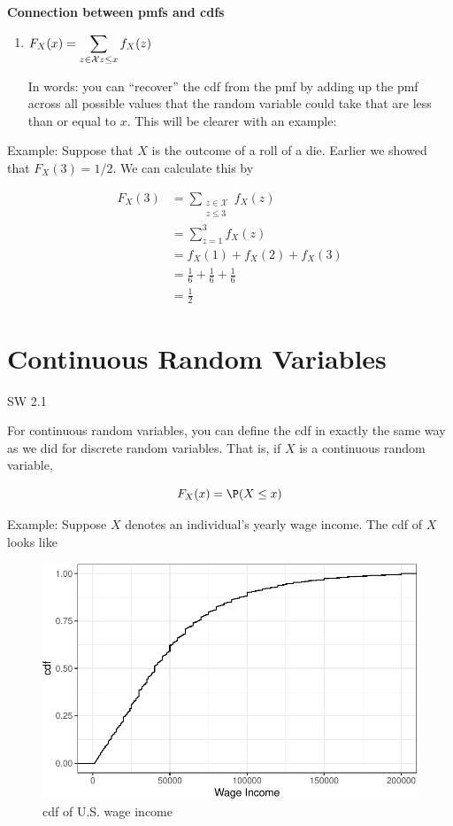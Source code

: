 \documentclass[
  letterpaper,
  DIV=11,
  numbers=noendperiod]{scrreprt}
\begin{document}
\textbf{Connection between pmfs and cdfs}

\begin{enumerate}
\def\labelenumi{\arabic{enumi}.}
\item
  \(F_X(x) = \displaystyle \sum_{z \in \mathcal{X} \\ z \leq x} f_X(z)\)

  In words: you can ``recover'' the cdf from the pmf by adding up the
  pmf across all possible values that the random variable could take
  that are less than or equal to \(x\). This will be clearer with an
  example:
\end{enumerate}

{Example: }Suppose that \(X\) is the outcome of a roll of a die. Earlier
we showed that \(F_X(3) = 1/2\). We can calculate this by

\[
  \begin{aligned}
  F_X(3) &= \sum_{\substack{z \in \mathcal{X} \\ z \leq 3}} f_X(z) \\
  &= \sum_{z=1}^3 f_X(z) \\
  &= f_X(1) + f_X(2) + f_X(3) \\
  &= \frac{1}{6} + \frac{1}{6} + \frac{1}{6} \\
  &= \frac{1}{2}
  \end{aligned}
\]

\section{Continuous Random Variables}\label{continuous-random-variables}

SW 2.1

For continuous random variables, you can define the cdf in exactly the
same way as we did for discrete random variables. That is, if \(X\) is a
continuous random variable,

\[
  F_X(x) = \P(X \leq x)
\]

{Example: } Suppose \(X\) denotes an individual's yearly wage income.
The cdf of \(X\) looks like

\begin{figure}[H]

{\centering \includegraphics{03-random_variables_files/figure-pdf/unnamed-chunk-5-1.pdf}

}

\caption{cdf of U.S. wage income}

\end{figure}%
\end{document}
